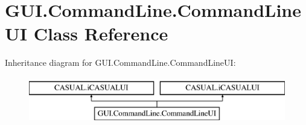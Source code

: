 \hypertarget{class_g_u_i_1_1_command_line_1_1_command_line_u_i}{\section{G\-U\-I.\-Command\-Line.\-Command\-Line\-U\-I Class Reference}
\label{class_g_u_i_1_1_command_line_1_1_command_line_u_i}
}
Inheritance diagram for G\-U\-I.\-Command\-Line.\-Command\-Line\-U\-I\-:\begin{figure}[H]
\begin{center}
\leavevmode
\includegraphics[height=2.000000cm]{class_g_u_i_1_1_command_line_1_1_command_line_u_i}
\end{center}
\end{figure}

